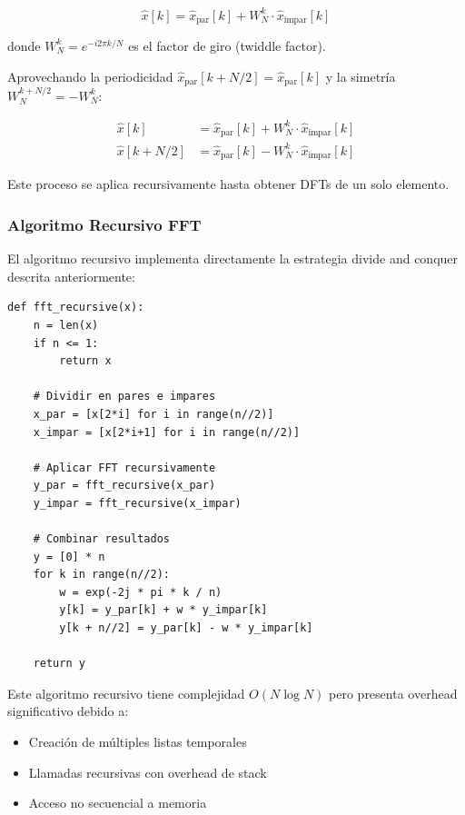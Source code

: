 \documentclass[a4paper]{article}
\begin{document}
\begin{equation}
    \hat{x}[k] = \hat{x}_{\text{par}}[k] + W_N^k \cdot \hat{x}_{\text{impar}}[k]
\end{equation}

donde $W_N^k = e^{-i2\pi k/N}$ es el factor de giro (twiddle factor).

Aprovechando la periodicidad $\hat{x}_{\text{par}}[k + N/2] = \hat{x}_{\text{par}}[k]$ y la simetría $W_N^{k+N/2} = -W_N^k$:

\begin{align}
    \hat{x}[k]       & = \hat{x}_{\text{par}}[k] + W_N^k \cdot \hat{x}_{\text{impar}}[k] \\
    \hat{x}[k + N/2] & = \hat{x}_{\text{par}}[k] - W_N^k \cdot \hat{x}_{\text{impar}}[k]
\end{align}

Este proceso se aplica recursivamente hasta obtener DFTs de un solo elemento.

\subsubsection{Algoritmo Recursivo FFT}

El algoritmo recursivo implementa directamente la estrategia divide and conquer descrita anteriormente:

\begin{verbatim}
def fft_recursive(x):
    n = len(x)
    if n <= 1:
        return x
    
    # Dividir en pares e impares
    x_par = [x[2*i] for i in range(n//2)]
    x_impar = [x[2*i+1] for i in range(n//2)]
    
    # Aplicar FFT recursivamente
    y_par = fft_recursive(x_par)
    y_impar = fft_recursive(x_impar)
    
    # Combinar resultados
    y = [0] * n
    for k in range(n//2):
        w = exp(-2j * pi * k / n)
        y[k] = y_par[k] + w * y_impar[k]
        y[k + n//2] = y_par[k] - w * y_impar[k]
    
    return y
\end{verbatim}

Este algoritmo recursivo tiene complejidad $O(N \log N)$ pero presenta overhead significativo debido a:
\begin{itemize}
    \item Creación de múltiples listas temporales
    \item Llamadas recursivas con overhead de stack
    \item Acceso no secuencial a memoria
\end{itemize}
\end{document}
